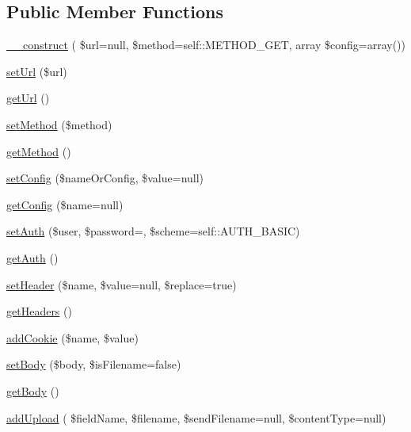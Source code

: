 \subsection*{Public Member Functions}
\begin{DoxyCompactItemize}
\item 
\hyperlink{classHTTP__Request2_a522b3736db10b76e1d3c0110e733a243}{\+\_\+\+\_\+construct} ( \$url=null, \$method=self\+::\+M\+E\+T\+H\+O\+D\+\_\+\+G\+ET, array \$config=array())
\item 
\hyperlink{classHTTP__Request2_a323cb019d1cb621ec9419941d42130d1}{set\+Url} (\$url)
\item 
\hyperlink{classHTTP__Request2_a35d9ef6e266d90ad52a5037b70850694}{get\+Url} ()
\item 
\hyperlink{classHTTP__Request2_a3372c369ddc092061cc15ff2f80a859f}{set\+Method} (\$method)
\item 
\hyperlink{classHTTP__Request2_a1a362b64dbeeb0321b55df04c6f2c820}{get\+Method} ()
\item 
\hyperlink{classHTTP__Request2_a57145f6158a2af444b1f7b3f38bcd0c9}{set\+Config} (\$name\+Or\+Config, \$value=null)
\item 
\hyperlink{classHTTP__Request2_a420485bbf5cc4a95399fe01138fe6ce6}{get\+Config} (\$name=null)
\item 
\hyperlink{classHTTP__Request2_a066db58a4f1f64971f2a08d9db9f636d}{set\+Auth} (\$user, \$password=\textquotesingle{}\textquotesingle{}, \$scheme=self\+::\+A\+U\+T\+H\+\_\+\+B\+A\+S\+IC)
\item 
\hyperlink{classHTTP__Request2_a92573cc9573e255bd2a9fe476153898f}{get\+Auth} ()
\item 
\hyperlink{classHTTP__Request2_adbdceb126835d75826cc461c27d27b14}{set\+Header} (\$name, \$value=null, \$replace=true)
\item 
\hyperlink{classHTTP__Request2_a49ae39a8a6531b205b15496e42b994cf}{get\+Headers} ()
\item 
\hyperlink{classHTTP__Request2_aeb8d7d755804ae328a7941be4d56aff7}{add\+Cookie} (\$name, \$value)
\item 
\hyperlink{classHTTP__Request2_acff40db54d3829648859a2832f93a004}{set\+Body} (\$body, \$is\+Filename=false)
\item 
\hyperlink{classHTTP__Request2_a206f758763ed28dce4341babf5c932d0}{get\+Body} ()
\item 
\hyperlink{classHTTP__Request2_afb07e9c784a37a75cbc809dd483f1894}{add\+Upload} ( \$field\+Name, \$filename, \$send\+Filename=null, \$content\+Type=null)
\item 

\end{DoxyCompactItemize}
